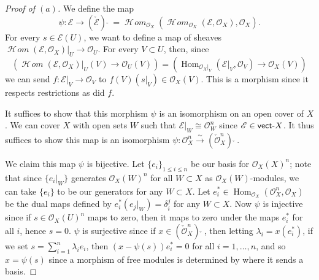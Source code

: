 \documentclass[12pt,letterpaper]{article}
\theoremstyle{definition}
\theoremstyle{remark}
\numberwithin{equation}{section}
\numberwithin{figure}{problem}
\DeclareMathOperator{\Hom}{Hom}
\newcommand{\EE}{\mathscr{E}}
\newcommand{\OO}{\mathcal{O}}
\DeclareMathOperator{\HHom}{\mathscr{H}\!\mathit{om}}
\newcommand{\isoto}{\overset{\sim}{\to}}
\newcommand{\vect}{\mathsf{vect}\mathchar`-}
\begin{document}
\begin{proof}[Proof of $(a)$]
  We define the map
  \begin{equation*}
    \psi\colon\EE \to (\check{\EE})\:\check{}\: = \HHom_{\OO_X}(\HHom_{\OO_X}(\EE,\OO_X),\OO_X).
  \end{equation*}
  For every $s \in \EE(U)$, we want to define a map of sheaves $\HHom(\EE,\OO_X)\vert_U \to \OO_U$. For every $V \subset U$, then, since
  \begin{equation*}
    \left(\HHom(\EE,\OO_X)\vert_U(V) \to \OO_U(V) \right) = \left( \Hom_{\OO_X\vert_V}(\EE\vert_V,\OO_V) \to \OO_X(V) \right)
  \end{equation*}
  we can send $f \colon \EE\vert_V\to\OO_V$ to $f(V)(s\vert_V) \in \OO_X(V)$. This is a morphism since it respects restrictions as did $f$.
  \par It suffices to show that this morphism $\psi$ is an isomorphism on an open cover of $X$. We can cover $X$ with open sets $W$ such that $\EE\vert_W \cong \OO_W^n$ since $\EE \in \vect X$. It thus suffices to show this map is an isomorphism $\psi\colon\OO_X^n \isoto (\check{\OO}_X^n)\:\check{}\:$.
  \par We claim this map $\psi$ is bijective. Let $\{e_i\}_{1 \le i \le n}$ be our basis for $\OO_X(X)^n$; note that since $\{e_i\vert_W\}$ generates $\OO_X(W)^n$ for all $W \subset X$ as $\OO_X(W)$-modules, we can take $\{e_i\}$ to be our generators for any $W \subset X$. Let $e_i^* \in \Hom_{\OO_X}(\OO_X^n,\OO_X)$ be the dual maps defined by $e_i^*(e_j\vert_W) = \delta_i^j$ for any $W \subset X$. Now $\psi$ is injective since if $s \in \OO_X(U)^n$ maps to zero, then it maps to zero under the maps $e_i^*$ for all $i$, hence $s = 0$. $\psi$ is surjective since if $x \in (\check{\OO}_X^n)\:\check{}\:$, then letting $\lambda_i = x(e_i^*)$, if we set $s = \sum_{i=1}^n \lambda_i e_i$, then $(x - \psi(s))e_i^* = 0$ for all $i = 1,\ldots,n$, and so $x = \psi(s)$ since a morphism of free modules is determined by where it sends a basis. 
\end{proof}
\end{document}
